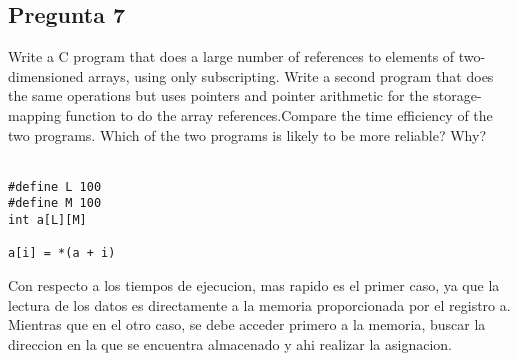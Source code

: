 \documentclass[12pt,oneside]{article}
\begin{document}
\subsection{\bf Pregunta 7}
Write a C program that does a large number of references to elements of two-dimensioned arrays, using only subscripting. Write a second program that does the same operations but uses pointers and pointer arithmetic for the storage-mapping function to do the array references.Compare the time efficiency of the two programs. Which of the two programs is likely to be more reliable? Why?\\\

\begin{lstlisting}[frame=single]
#define L 100
#define M 100
int a[L][M]

a[i] = *(a + i)
\end{lstlisting}
Con respecto a los tiempos de ejecucion, mas rapido es el primer caso, ya que la lectura de los datos es directamente a la memoria proporcionada por el registro a. Mientras que en el otro caso, se debe acceder primero a la memoria, buscar la direccion en la que se encuentra almacenado y ahi realizar la asignacion.
\end{document}
